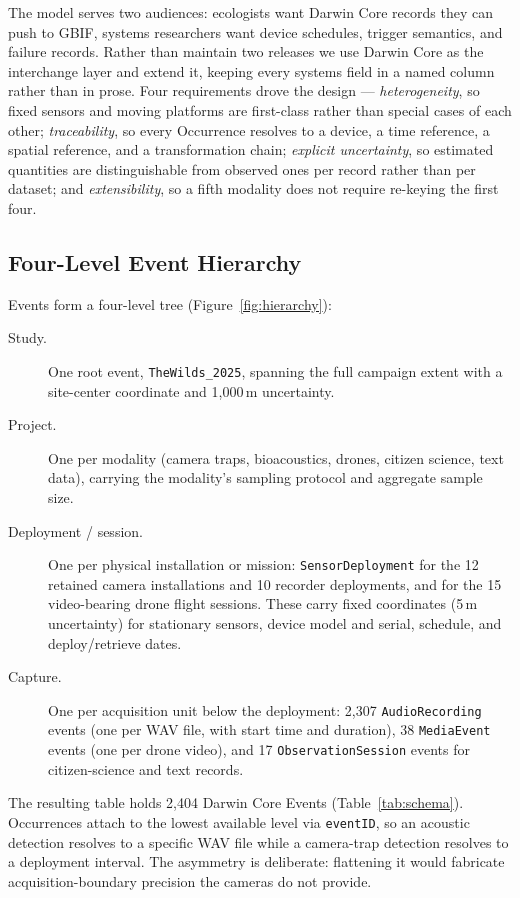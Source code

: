 \documentclass[sigconf]{acmart}
\begin{document}
The model serves two audiences: ecologists want Darwin Core records they
can push to GBIF, systems researchers want device schedules, trigger
semantics, and failure records. Rather than maintain two releases we use
Darwin Core as the interchange layer and extend it, keeping every
systems field in a named column rather than in prose. Four requirements
drove the design --- \emph{heterogeneity}, so fixed sensors and moving
platforms are first-class rather than special cases of each other;
\emph{traceability}, so every Occurrence resolves to a device, a time
reference, a spatial reference, and a transformation chain;
\emph{explicit uncertainty}, so estimated quantities are distinguishable
from observed ones per record rather than per dataset; and
\emph{extensibility}, so a fifth modality does not require re-keying the
first four.

\subsection{Four-Level Event Hierarchy}

Events form a four-level tree (Figure~\ref{fig:hierarchy}):

\begin{description}
\item[Study.] One root event, \texttt{TheWilds\_2025}, spanning the full
campaign extent with a site-center coordinate and 1{,}000\,m
uncertainty.
\item[Project.] One per modality (camera traps, bioacoustics, drones,
citizen science, text data), carrying the modality's sampling protocol
and aggregate sample size.
\item[Deployment / session.] One per physical installation or mission:
\texttt{SensorDeployment} for the 12 retained camera installations and
10 recorder deployments, and for the 15 video-bearing drone flight sessions. These
carry fixed coordinates (5\,m uncertainty) for stationary sensors,
device model and serial, schedule, and deploy/retrieve dates.
\item[Capture.] One per acquisition unit below the deployment:
2{,}307 \texttt{AudioRecording} events (one per WAV file, with
start time and duration), 38 \texttt{MediaEvent} events (one per drone
video), and 17 \texttt{ObservationSession} events for citizen-science
and text records.
\end{description}

The resulting table holds 2{,}404 Darwin Core Events
(Table~\ref{tab:schema}). Occurrences attach to the lowest available
level via \texttt{eventID}, so an acoustic detection resolves to a
specific WAV file while a camera-trap detection resolves to a deployment
interval. The asymmetry is deliberate: flattening it would fabricate
acquisition-boundary precision the cameras do not provide.
\end{document}
